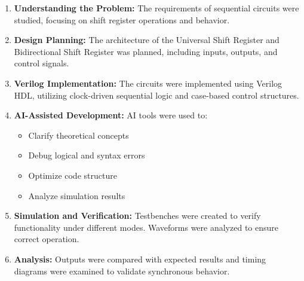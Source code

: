 \documentclass[12pt]{article}
\begin{document}
\begin{enumerate}
    \item \textbf{Understanding the Problem:}  
    The requirements of sequential circuits were studied, focusing on shift register operations and behavior.

    \item \textbf{Design Planning:}  
    The architecture of the Universal Shift Register and Bidirectional Shift Register was planned, including inputs, outputs, and control signals.

    \item \textbf{Verilog Implementation:}  
    The circuits were implemented using Verilog HDL, utilizing clock-driven sequential logic and case-based control structures.

    \item \textbf{AI-Assisted Development:}  
    AI tools were used to:
    \begin{itemize}
        \item Clarify theoretical concepts
        \item Debug logical and syntax errors
        \item Optimize code structure
        \item Analyze simulation results
    \end{itemize}

    \item \textbf{Simulation and Verification:}  
    Testbenches were created to verify functionality under different modes. Waveforms were analyzed to ensure correct operation.

    \item \textbf{Analysis:}  
    Outputs were compared with expected results and timing diagrams were examined to validate synchronous behavior.

\end{enumerate}
\end{document}
